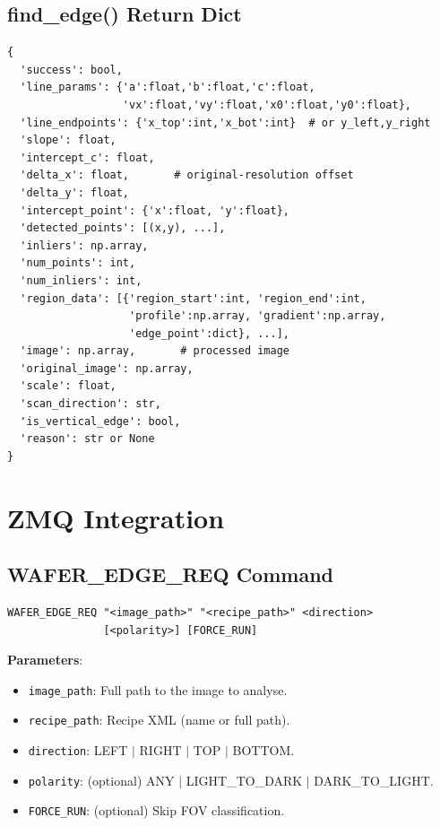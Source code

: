 \documentclass[11pt,a4paper]{article}
\begin{document}
\subsection{find\_edge() Return Dict}
\begin{lstlisting}
{
  'success': bool,
  'line_params': {'a':float,'b':float,'c':float,
                  'vx':float,'vy':float,'x0':float,'y0':float},
  'line_endpoints': {'x_top':int,'x_bot':int}  # or y_left,y_right
  'slope': float,
  'intercept_c': float,
  'delta_x': float,       # original-resolution offset
  'delta_y': float,
  'intercept_point': {'x':float, 'y':float},
  'detected_points': [(x,y), ...],
  'inliers': np.array,
  'num_points': int,
  'num_inliers': int,
  'region_data': [{'region_start':int, 'region_end':int,
                   'profile':np.array, 'gradient':np.array,
                   'edge_point':dict}, ...],
  'image': np.array,       # processed image
  'original_image': np.array,
  'scale': float,
  'scan_direction': str,
  'is_vertical_edge': bool,
  'reason': str or None
}
\end{lstlisting}

\section{ZMQ Integration}

\subsection{WAFER\_EDGE\_REQ Command}
\begin{verbatim}
WAFER_EDGE_REQ "<image_path>" "<recipe_path>" <direction>
               [<polarity>] [FORCE_RUN]
\end{verbatim}

\textbf{Parameters}:
\begin{itemize}[nosep]
\item \texttt{image\_path}: Full path to the image to analyse.
\item \texttt{recipe\_path}: Recipe XML (name or full path).
\item \texttt{direction}: LEFT $|$ RIGHT $|$ TOP $|$ BOTTOM.
\item \texttt{polarity}: (optional) ANY $|$ LIGHT\_TO\_DARK $|$ DARK\_TO\_LIGHT.
\item \texttt{FORCE\_RUN}: (optional) Skip FOV classification.
\end{itemize}
\end{document}
